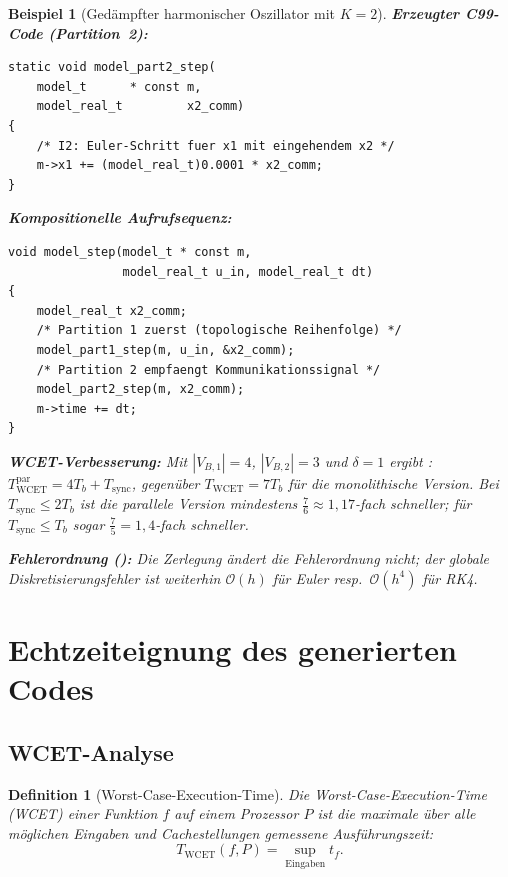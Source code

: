 ﻿\documentclass[12pt,a4paper]{article}
\newtheorem{definition}[theorem]{Definition}
\newtheorem{beispiel}[theorem]{Beispiel}
\theoremstyle{definition}
\begin{document}
\begin{beispiel}[Gedämpfter harmonischer Oszillator mit $K = 2$]
\textbf{Erzeugter C99-Code (Partition~2):}
\begin{lstlisting}[style=cstyle, caption={Subgraph Algorithmus -- Partie 2: Zustandsintegration}]
static void model_part2_step(
    model_t      * const m,
    model_real_t         x2_comm)
{
    /* I2: Euler-Schritt fuer x1 mit eingehendem x2 */
    m->x1 += (model_real_t)0.0001 * x2_comm;
}
\end{lstlisting}

\textbf{Kompositionelle Aufrufsequenz:}
\begin{lstlisting}[style=cstyle, caption={Kompositionelle Aufrufsequenz des Subgraph Algorithmus}]
void model_step(model_t * const m,
                model_real_t u_in, model_real_t dt)
{
    model_real_t x2_comm;
    /* Partition 1 zuerst (topologische Reihenfolge) */
    model_part1_step(m, u_in, &x2_comm);
    /* Partition 2 empfaengt Kommunikationssignal */
    model_part2_step(m, x2_comm);
    m->time += dt;
}
\end{lstlisting}

\textbf{WCET-Verbesserung:} Mit $|V_{B,1}| = 4$, $|V_{B,2}| = 3$ und
$\delta = 1$ ergibt :
$T_{\mathrm{WCET}}^{\mathrm{par}} = 4 T_b + T_{\mathrm{sync}}$,
gegenüber $T_{\mathrm{WCET}} = 7 T_b$ für die monolithische Version.
Bei $T_{\mathrm{sync}} \leq 2 T_b$ ist die parallele Version mindestens
$\frac{7}{6} \approx 1{,}17$-fach schneller; für $T_{\mathrm{sync}} \leq T_b$ sogar
$\frac{7}{5} = 1{,}4$-fach schneller.

\textbf{Fehlerordnung ():}
Die Zerlegung ändert die Fehlerordnung nicht;
der globale Diskretisierungsfehler ist weiterhin $\mathcal{O}(h)$ für
Euler resp.\ $\mathcal{O}(h^4)$ für RK4.
\end{beispiel}

\section{Echtzeiteignung des generierten Codes}
\label{sec:rt}


\subsection{WCET-Analyse}

\begin{definition}[Worst-Case-Execution-Time]
Die \emph{Worst-Case-Execution-Time} (WCET) einer Funktion $f$ auf einem
Prozessor $P$ ist die maximale über alle möglichen Eingaben und
Cachestellungen gemessene Ausführungszeit:
\[
  T_{\mathrm{WCET}}(f, P) = \sup_{\text{Eingaben}} t_f.
\]
\end{definition}
\end{document}
